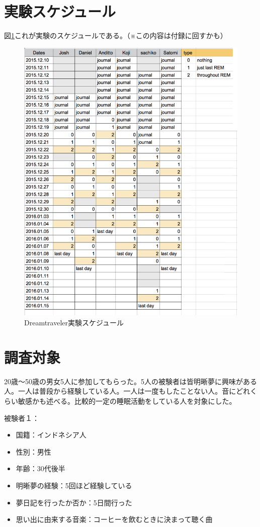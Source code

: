 \section{実験スケジュール}
図\ref{schedule}これが実験のスケジュールである。（※この内容は付録に回すかも）
\begin{figure}[htbp]
\begin{center}
\includegraphics[width=15cm]{eps/schedule.eps}
\caption{Dreamtraveler実験スケジュール}
\label{schedule}
\end{center}
\end{figure}

\section{調査対象}
20歳〜50歳の男女5人に参加してもらった。5人の被験者は皆明晰夢に興味がある人。一人は普段から経験している人。一人は一度もしたことない人。音にどれくらい敏感かも述べる。比較的一定の睡眠活動をしている人を対象にした。

被験者１：
\begin{itemize}
\item 国籍：インドネシア人
\item 性別：男性
\item 年齢：30代後半
\item 明晰夢の経験：5回ほど経験している
\item 夢日記を行ったか否か：5日間行った
\item 思い出に由来する音楽：コーヒーを飲むときに決まって聴く曲
\end{itemize}


